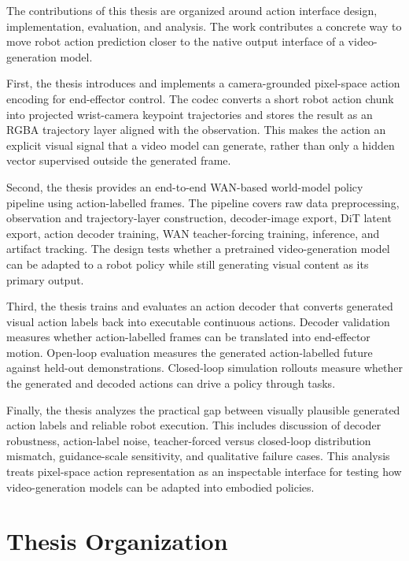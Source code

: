 The contributions of this thesis are organized around action interface design, implementation, evaluation, and analysis. The work contributes a concrete way to move robot action prediction closer to the native output interface of a video-generation model.

First, the thesis introduces and implements a camera-grounded pixel-space action encoding for end-effector control. The codec converts a short robot action chunk into projected wrist-camera keypoint trajectories and stores the result as an RGBA trajectory layer aligned with the observation. This makes the action an explicit visual signal that a video model can generate, rather than only a hidden vector supervised outside the generated frame.

Second, the thesis provides an end-to-end WAN-based world-model policy pipeline using action-labelled frames. The pipeline covers raw data preprocessing, observation and trajectory-layer construction, decoder-image export, DiT latent export, action decoder training, WAN teacher-forcing training, inference, and artifact tracking. The design tests whether a pretrained video-generation model can be adapted to a robot policy while still generating visual content as its primary output.

Third, the thesis trains and evaluates an action decoder that converts generated visual action labels back into executable continuous actions. Decoder validation measures whether action-labelled frames can be translated into end-effector motion. Open-loop evaluation measures the generated action-labelled future against held-out demonstrations. Closed-loop simulation rollouts measure whether the generated and decoded actions can drive a policy through tasks.

Finally, the thesis analyzes the practical gap between visually plausible generated action labels and reliable robot execution. This includes discussion of decoder robustness, action-label noise, teacher-forced versus closed-loop distribution mismatch, guidance-scale sensitivity, and qualitative failure cases. This analysis treats pixel-space action representation as an inspectable interface for testing how video-generation models can be adapted into embodied policies.


\section{Thesis Organization}

